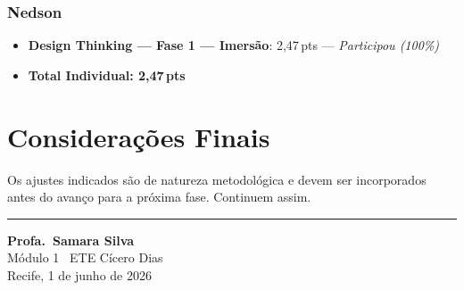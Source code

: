 \documentclass[
  sigconf,
  language=portuguese
]{acmart}
\begin{document}
\subsubsection*{Nedson}

\begin{itemize}[leftmargin=14pt,itemsep=2pt,topsep=3pt,parsep=0pt]
  \item \textbf{Design Thinking — Fase 1 — Imersão}: 2,47\,pts — \textit{Participou (100\%)}

  \item[\textbf{=}] \textbf{Total Individual: 2,47\,pts}
\end{itemize}


\section{Considera\c{c}\~oes Finais}

Os ajustes indicados s\~ao de natureza metodol\'{o}gica e devem ser
incorporados antes do avan\c{c}o para a pr\'{o}xima fase.
Continuem assim.


\noindent\rule{\linewidth}{0.4pt}

\begin{flushright}
\textbf{Profa.\ Samara Silva}\\
{\small\color{cmuted} M\'{o}dulo 1 \textperiodcentered\ ETE C\'{i}cero Dias}\\
{\small\color{cmuted} Recife, 1 de junho de 2026}
\end{flushright}
\end{document}
